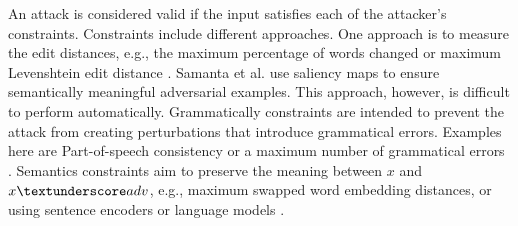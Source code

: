     An attack is considered valid if the input satisfies each of the attacker's constraints. 
    Constraints include different approaches. One approach is to measure the edit distances, e.g., the maximum percentage of words changed \cite{ebrahimi2017hotflip} or maximum Levenshtein edit distance \cite{gao2018black}. Samanta et al. use saliency maps to ensure semantically meaningful adversarial examples\cite{samanta2017towards}. This approach, however, is difficult to perform automatically. Grammatically constraints are intended to prevent the attack from creating perturbations that introduce grammatical errors. Examples here are Part-of-speech consistency or a maximum number of grammatical errors \cite{ebrahimi2017hotflip, jin2019bert}. Semantics constraints aim to preserve the meaning between $x$ and $x\textunderscore adv$, e.g., maximum swapped word embedding distances, or using sentence encoders or language models \cite{cer2018universal, garg2020bae, jin2019bert, li2018textbugger, alzantot2018generating, ebrahimi2017hotflip}.


